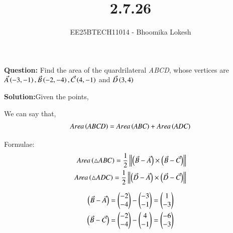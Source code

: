 \documentclass[journal]{IEEEtran}
\begin{document}

\vspace{3cm}

\title{2.7.26}
\author{EE25BTECH11014 - Bhoomika Lokesh}
{\let\newpage\relax\maketitle}

\renewcommand{\thefigure}{\theenumi}
\renewcommand{\thetable}{\theenumi}
\setlength{\intextsep}{10pt} %


\renewcommand{\thetable}{\theenumi}

\textbf{Question:}
Find the area of the quardrilateral \textit{ABCD}, whose vertices are $\Vec{A}\left(-3,-1\right),\Vec{B}\left(-2,-4\right),\Vec{C}\left(4,-1\right)$ and $\Vec{D}\left(3,4\right)$

\textbf{Solution:}Given the points,
\begin{table}[H]    
  \centering
  
  \caption{Variables Used}
  \label{tab:2.7.26}
\end{table}

 We can say that, 
 \begin{align}
Area \left(\textit{ABCD}\right)=Area\left(\textit{ABC}\right)+Area\left(\textit{ADC}\right)
 \end{align}

 Formulae:
 \begin{align}
\textit{Area}\left(\triangle ABC\right)
= \frac{1}{2} \left\| \left(\Vec{B}-\Vec{A}\right) \times \left(\Vec{B}-\Vec{C}\right) \right\|
\\
\textit{Area}\left(\triangle ADC\right)
= \frac{1}{2} \left\| \left(\Vec{D}-\Vec{A}\right) \times \left(\Vec{D}-\Vec{C}\right) \right\|
\end{align}

 \begin{align}
 \left(\Vec{B}-\Vec{A}\right)=\begin{pmatrix}-2\\-4\end{pmatrix}-\begin{pmatrix}-3\\-1\end{pmatrix}=\begin{pmatrix}1\\-3\end{pmatrix}\\ 
  \left(\Vec{B}-\Vec{C}\right)=\begin{pmatrix}-2\\-4\end{pmatrix}-\begin{pmatrix}4\\-1\end{pmatrix}=\begin{pmatrix}-6\\-3\end{pmatrix}
 \end{align}
 
\end{document}
